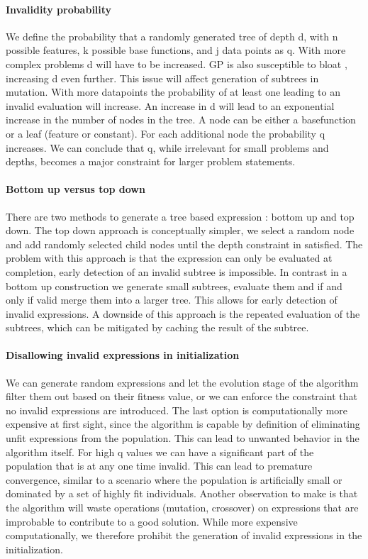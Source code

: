 \paragraph{Invalidity probability}
We define the probability that a randomly generated tree of depth d, with n possible features, k possible base functions, and j data points as q. With more complex problems d will have to be increased. GP is also susceptible to bloat \cite{GPBloat}, increasing d even further. This issue will affect generation of subtrees in mutation. With more datapoints the probability of at least one leading to an invalid evaluation will increase. An increase in d will lead to an exponential increase in the number of nodes in the tree. A node can be either a basefunction or a leaf (feature or constant). For each additional node the probability q increases. We can conclude that q, while irrelevant for small problems and depths, becomes a major constraint for larger problem statements.

\paragraph{Bottom up versus top down}
There are two methods to generate a tree based expression : bottom up and top down. The top down approach is conceptually simpler, we select a random node and add randomly selected child nodes until the depth constraint in satisfied. The problem with this approach is that the expression can only be evaluated at completion, early detection of an invalid subtree is impossible.
In contrast in a bottom up construction we generate small subtrees, evaluate them and if and only if valid merge them into a larger tree. This allows for early detection of invalid expressions. A downside of this approach is the repeated evaluation of the subtrees, which can be mitigated by caching the result of the subtree.

\paragraph{Disallowing invalid expressions in initialization}
We can generate random expressions and let the evolution stage of the algorithm filter them out based on their fitness value, or we can enforce the constraint that no invalid expressions are introduced. The last option is computationally more expensive at first sight, since the algorithm is capable by definition of eliminating unfit expressions from the population.
This can lead to unwanted behavior in the algorithm itself. For high q values we can have a significant part of the population that is at any one time invalid. This can lead to premature convergence, similar to a scenario where the population is artificially small or dominated by a set of highly fit individuals. Another observation to make is that the algorithm will waste operations (mutation, crossover) on expressions that are improbable to contribute to a good solution.
While more expensive computationally, we therefore prohibit the generation of invalid expressions in the initialization.

